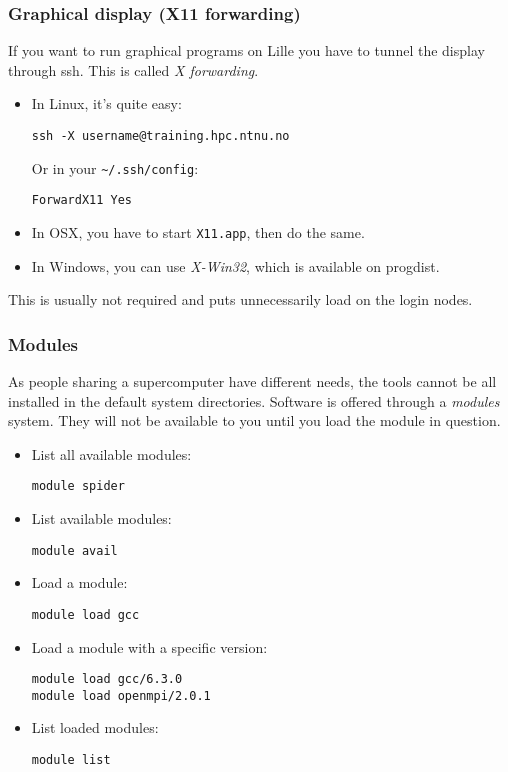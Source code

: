 \begin{frame}[fragile]
  \frametitle{Graphical display (X11 forwarding)}
  If you want to run graphical programs on Lille you have to tunnel the display
  through ssh. This is called \emph{X forwarding}.
  \begin{itemize}
  \item In Linux, it's quite easy:
\begin{lstlisting}[style=shell]
ssh -X username@training.hpc.ntnu.no
\end{lstlisting}
  Or in your \texttt{\textasciitilde/.ssh/config}:
\begin{lstlisting}[style=shell]
ForwardX11 Yes
\end{lstlisting}
    \item In OSX, you have to start \texttt{X11.app}, then do the same.
    \item In Windows, you can use \emph{X-Win32}, which is available on progdist.
  \end{itemize}

This is usually not required and puts unnecessarily load on the login nodes.
\end{frame}

\begin{frame}[fragile]
  \frametitle{Modules}
  As people sharing a supercomputer have different needs, the tools cannot be all installed in the default system directories.
  Software is offered through a \emph{modules} system. They will not be available to you until you load the module in question.
  \begin{itemize}
  \item List all available modules:
\begin{lstlisting}[style=shell]
module spider
\end{lstlisting}
  \item List available modules:
\begin{lstlisting}[style=shell]
module avail
\end{lstlisting}
  \item Load a module:
\begin{lstlisting}[style=shell]
module load gcc
\end{lstlisting}
  \item Load a module with a specific version:
\begin{lstlisting}[style=shell]
module load gcc/6.3.0
module load openmpi/2.0.1
\end{lstlisting}
  \item List loaded modules:
\begin{lstlisting}[style=shell]
module list
\end{lstlisting}
  \end{itemize}
\end{frame}

